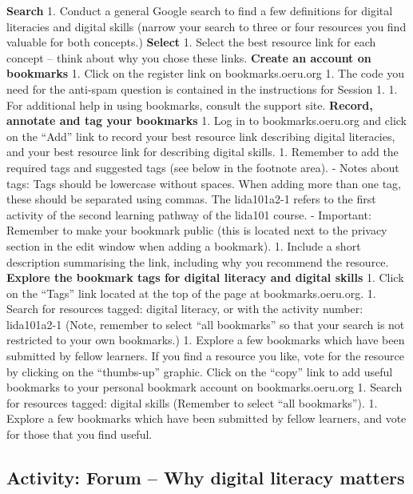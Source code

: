 \documentclass[
]{book}
\theoremstyle{definition}
\theoremstyle{definition}
\theoremstyle{definition}
\theoremstyle{definition}
\theoremstyle{remark}
\begin{document}
\begin{reflect}
\textbf{Search}
1. Conduct a general Google search to find a few definitions for digital literacies and digital skills (narrow your search to three or four resources you find valuable for both concepts.)
\textbf{Select}
1. Select the best resource link for each concept -- think about why you chose these links.
\textbf{Create an account on bookmarks}
1. Click on the register link on bookmarks.oeru.org
1. The code you need for the anti-spam question is contained in the instructions for Session 1.
1. For additional help in using bookmarks, consult the support site.
\textbf{Record, annotate and tag your bookmarks}
1. Log in to bookmarks.oeru.org and click on the ``Add'' link to record your best resource link describing digital literacies, and your best resource link for describing digital skills.
1. Remember to add the required tags and suggested tags (see below in the footnote area).
- Notes about tags: Tags should be lowercase without spaces. When adding more than one tag, these should be separated using commas. The lida101a2-1 refers to the first activity of the second learning pathway of the lida101 course.
- Important: Remember to make your bookmark public (this is located next to the privacy section in the edit window when adding a bookmark).
1. Include a short description summarising the link, including why you recommend the resource.
\textbf{Explore the bookmark tags for digital literacy and digital skills}
1. Click on the ``Tags'' link located at the top of the page at bookmarks.oeru.org.
1. Search for resources tagged: digital literacy, or with the activity number: lida101a2-1 (Note, remember to select ``all bookmarks'' so that your search is not restricted to your own bookmarks.)
1. Explore a few bookmarks which have been submitted by fellow learners. If you find a resource you like, vote for the resource by clicking on the ``thumbs-up'' graphic. Click on the ``copy'' link to add useful bookmarks to your personal bookmark account on bookmarks.oeru.org
1. Search for resources tagged: digital skills (Remember to select ``all bookmarks'').
1. Explore a few bookmarks which have been submitted by fellow learners, and vote for those that you find useful.
\end{reflect}

\hypertarget{activity-forum-why-digital-literacy-matters}{%
\subsection*{Activity: Forum -- Why digital literacy matters}\label{activity-forum-why-digital-literacy-matters}}
\end{document}
